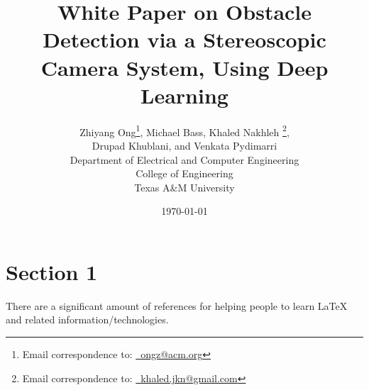 \documentclass[letter,12pt]{article}
\begin{document}
\title{White Paper on Obstacle Detection via a Stereoscopic Camera System, Using Deep Learning}
\date{\today}
\author{Zhiyang Ong\thanks{Email correspondence to: \href{mailto:ongz@acm.org}{\Email\ ongz@acm.org}}, Michael Bass, Khaled Nakhleh \thanks{Email correspondence to: \href{mailto:khaled.jkn@gmail.com}{\Email\ khaled.jkn@gmail.com}}, \\
Drupad Khublani, and Venkata Pydimarri \\
Department of Electrical and Computer Engineering \\
College of Engineering \\
Texas A\&M University
}
\maketitle







\section{Section 1}
\label{sec:mysection1}

There are a significant amount of references for helping people to learn \LaTeX \cite{Voss2011,vanDongen2012,Syropoulos2003,Raymond2004,Mittelbach2004,Lamport1994,Krishnan2003,Krantz2001,Kottwitz2011,Koranne2011,Kopka2004,Knuth1999,Hoenig1998,Higham1998,Haralambous2007,Griffiths1997,Gratzer2007,Goossens2007,Goossens1999,Goossens1997,Diller1999,Bindner2011,Berry2009,UITCambridge2011,Scharrer2011,Pakin2008,Cormen2010,Syropoulos2004,Hamalainen2006} and related information/technologies.
\end{document}
